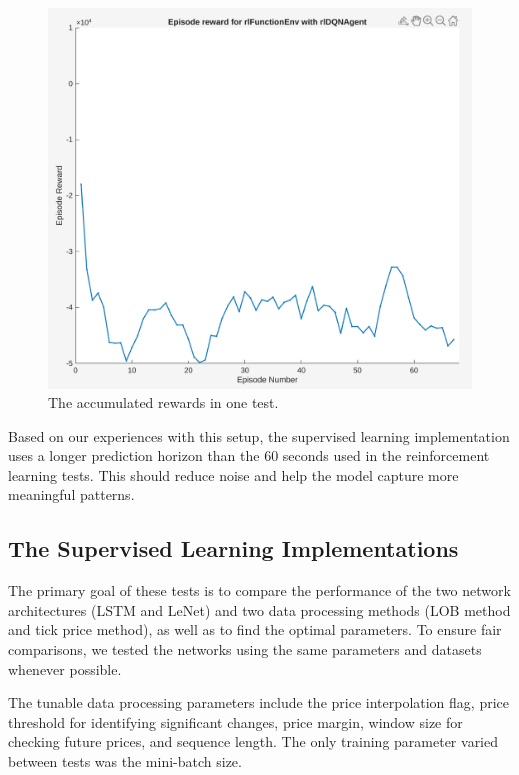 \documentclass[a4paper,oneside,onecolumn,12pt]{book}
\begin{document}
	\begin{figure}[H]
	\begin{center}
		\includegraphics[width=\linewidth]{kep/RL1_episode_rewards.png}
		\caption{The accumulated rewards in one test.}
		\label{fig:rl_episode_rewards}
	\end{center}
	\end{figure}
	
	Based on our experiences with this setup, the supervised learning implementation uses a longer prediction horizon than the 60 seconds used in the reinforcement learning tests. This should reduce noise and help the model capture more meaningful patterns.

	\subsection{The Supervised Learning Implementations}
	The primary goal of these tests is to compare the performance of the two network architectures (LSTM and LeNet) and two data processing methods (LOB method and tick price method), as well as to find the optimal parameters. To ensure fair comparisons, we tested the networks using the same parameters and datasets whenever possible.

	The tunable data processing parameters include the price interpolation flag, price threshold for identifying significant changes, price margin, window size for checking future prices, and sequence length. The only training parameter varied between tests was the mini-batch size.
\end{document}
